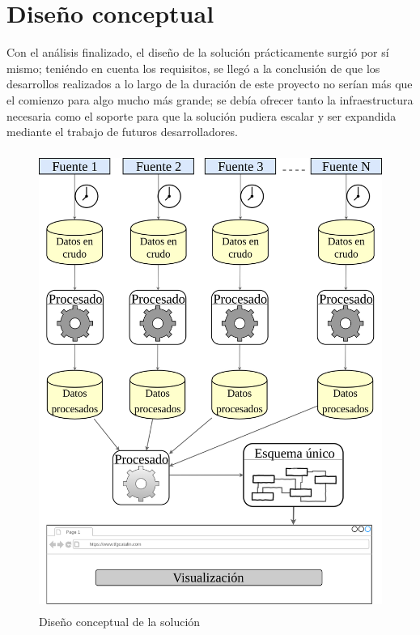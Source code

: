 \section{Diseño conceptual} \label{disenyo.conceptual}
Con el análisis finalizado, el diseño de la solución prácticamente surgió por sí mismo; teniéndo en cuenta los requisitos, se llegó a la conclusión de que los desarrollos realizados a lo largo de la duración de este proyecto no serían más que el comienzo para algo mucho más grande; se debía ofrecer tanto la infraestructura necesaria como el soporte para que la solución pudiera escalar y ser expandida mediante el trabajo de futuros desarrolladores. 
\begin{figure}[!t]
    \centering
    \includegraphics[width=1\textwidth,height=15cm,keepaspectratio]{Imagenes/disenyoconceptual}
    \caption{Diseño conceptual de la solución}
    \label{fig:disenyoconceptual}
\end{figure}
\par 
